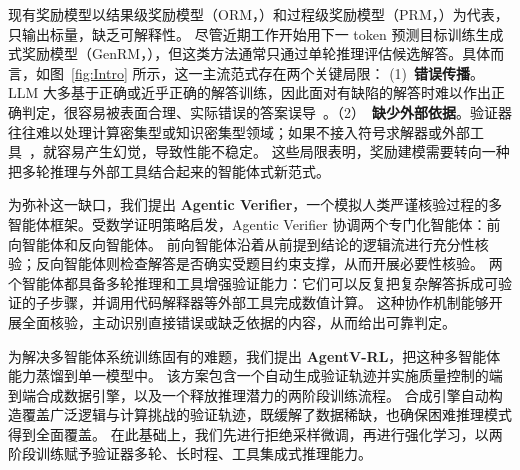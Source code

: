 \documentclass[11pt]{article}
\begin{document}
\par
现有奖励模型以结果级奖励模型（ORM，\citealp{zhong2025comprehensivesurveyrewardmodels,wang2024secretsrlhflargelanguage,Zhang:2025:CRM}）和过程级奖励模型（PRM，\citealp{zhang2025lessonsdevelopingprocessreward,chen2025better,Lightman:2024:MATH500, cui2025processreinforcementimplicitrewards}）为代表，只输出标量，缺乏可解释性。
尽管近期工作开始用下一 token 预测目标训练生成式奖励模型（GenRM，\citealp{Mahan:2025:GRM,Zhang:2025:GenerativeVerifiers,Chen:2025:RM-R1,Liu:2025:DeepseekGRM}），但这类方法通常只通过单轮推理评估候选解答。具体而言，如图~\ref{fig:Intro} 所示，这一主流范式存在两个关键局限：
(1)~\textbf{错误传播}。LLM 大多基于正确或近乎正确的解答训练，因此面对有缺陷的解答时难以作出正确判定，很容易被表面合理、实际错误的答案误导~\citep{Zhang:2025:GenerativeVerifiers}。（2）~\textbf{缺少外部依据}。验证器往往难以处理计算密集型或知识密集型领域；如果不接入符号求解器或外部工具~\citep{Dong:2025:AEPO,Feng:2025:ReTool,Dong:2025:ToolStar}，就容易产生幻觉，导致性能不稳定。
这些局限表明，奖励建模需要转向一种把多轮推理与外部工具结合起来的智能体式新范式。

\par
为弥补这一缺口，我们提出 \textbf{Agentic Verifier}，一个模拟人类严谨核验过程的多智能体框架。受数学证明策略启发，Agentic Verifier 协调两个专门化智能体：前向智能体和反向智能体。
前向智能体沿着从前提到结论的逻辑流进行充分性核验；反向智能体则检查解答是否确实受题目约束支撑，从而开展必要性核验。
两个智能体都具备多轮推理和工具增强验证能力：它们可以反复把复杂解答拆成可验证的子步骤，并调用代码解释器等外部工具完成数值计算。
这种协作机制能够开展全面核验，主动识别直接错误或缺乏依据的内容，从而给出可靠判定。

\par
为解决多智能体系统训练固有的难题，我们提出 \textbf{AgentV-RL}，把这种多智能体能力蒸馏到单一模型中。
该方案包含一个自动生成验证轨迹并实施质量控制的端到端合成数据引擎，以及一个释放推理潜力的两阶段训练流程。
合成引擎自动构造覆盖广泛逻辑与计算挑战的验证轨迹，既缓解了数据稀缺，也确保困难推理模式得到全面覆盖。
在此基础上，我们先进行拒绝采样微调，再进行强化学习，以两阶段训练赋予验证器多轮、长时程、工具集成式推理能力。
\end{document}
